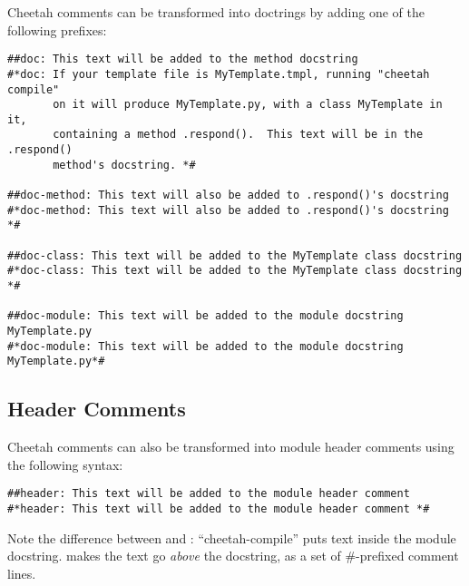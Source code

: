 Cheetah comments can be transformed into doctrings by adding one of the
following prefixes:

\begin{verbatim}
##doc: This text will be added to the method docstring
#*doc: If your template file is MyTemplate.tmpl, running "cheetah compile"
       on it will produce MyTemplate.py, with a class MyTemplate in it,
       containing a method .respond().  This text will be in the .respond()
       method's docstring. *#

##doc-method: This text will also be added to .respond()'s docstring
#*doc-method: This text will also be added to .respond()'s docstring *#

##doc-class: This text will be added to the MyTemplate class docstring
#*doc-class: This text will be added to the MyTemplate class docstring *#

##doc-module: This text will be added to the module docstring MyTemplate.py
#*doc-module: This text will be added to the module docstring MyTemplate.py*#
\end{verbatim}

\subsection{Header Comments}
\label{comments.headers}
Cheetah comments can also be transformed into module header comments using the
following syntax:

\begin{verbatim}
##header: This text will be added to the module header comment
#*header: This text will be added to the module header comment *#
\end{verbatim}

Note the difference between  and :
``cheetah-compile'' puts  text inside the module
docstring.   makes the text go {\em above} the docstring, as a
set of \#-prefixed comment lines.

